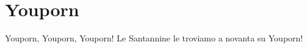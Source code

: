 \section{Youporn}
\subtitle{Sul ritornello di “Carneval de Paris” di Wender e Paolo Noise}
\begin{canzone}
Youporn, Youporn, Youporn!
Le Santannine le troviamo
a novanta su Youporn!
\end{canzone}
